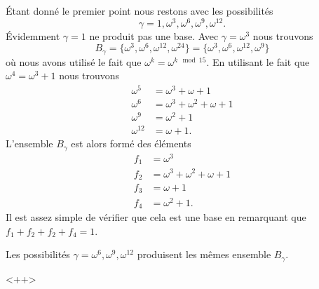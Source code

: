 \begin{example}
\begin{enumerate}
            Étant donné le premier point nous restons avec les possibilités
            \begin{equation}
                \gamma=1,\omega^3,\omega^6,\omega^9,\omega^{12}.
            \end{equation}
            Évidemment \( \gamma=1\) ne produit pas une base. Avec \( \gamma=\omega^3\) nous trouvons
            \begin{equation}
                B_{\gamma}=\{ \omega^3,\omega^6,\omega^{12},\omega^{24} \}=\{ \omega^3,\omega^6,\omega^{12},\omega^9 \}
            \end{equation}
            où nous avons utilisé le fait que \( \omega^k=\omega^{k\mod 15}\). En utilisant le fait que \( \omega^4=\omega^3+1\) nous trouvons
            \begin{subequations}
                \begin{align}
                    \omega^5&=\omega^3+\omega+1\\
                    \omega^6&=\omega^3+\omega^2+\omega+1\\
                    \omega^9&=\omega^2+1\\
                    \omega^{12}&=\omega+1.
                \end{align}
            \end{subequations}
            L'ensemble \( B_{\gamma}\) est alors formé des éléments
            \begin{subequations}
                \begin{align}
                    f_1&=\omega^3\\
                    f_2&=\omega^3+\omega^2+\omega+1\\
                    f_3&=\omega+1\\
                    f_4&=\omega^2+1.
                \end{align}
            \end{subequations}
            Il est assez simple de vérifier que cela est une base en remarquant que \( f_1+f_2+f_2+f_4=1\).

            Les possibilités \( \gamma=\omega^6,\omega^9,\omega^{12}\) produisent les mêmes ensemble \( B_{\gamma}\).
    \end{enumerate}

\end{example}
<++>



